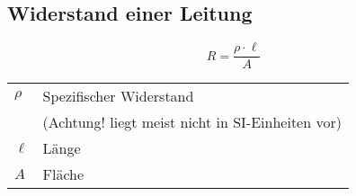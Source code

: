 



\subsection{Widerstand einer Leitung}
\[ R = \frac{\rho \cdot \ell}{A} \]
\begin{tabular}{lp{}}
$\rho$&Spezifischer Widerstand\\
&(Achtung! liegt meist nicht in SI-Einheiten vor)\\
$\ell$&Länge\\
   $A$&Fläche
\end{tabular}